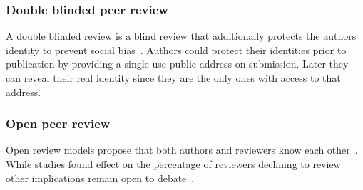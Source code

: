 \subsubsection*{Double blinded peer review}
A double blinded review is a blind review that additionally protects the authors
identity to prevent social bias~\cite{lee2013bias,budden2008double}. Authors
could protect their identities prior to publication by providing a single-use
public address on submission. Later they can reveal their real identity since
they are the only ones with access to that address.

\subsubsection*{Open peer review}

Open review models propose that both authors and reviewers know each
other~\cite{ford2013defining}. While studies found effect on the percentage of
reviewers declining to review~\cite{van1999effect} other implications remain
open to debate~\cite{groves2010open}.






